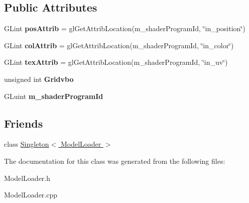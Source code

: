 \subsection*{Public Attributes}
\begin{DoxyCompactItemize}
\item 
\hypertarget{classModelLoader_aa3eb17f659b30e28874112f08f676e18}{
GLint {\bfseries posAttrib} = glGetAttribLocation(m\_\-shaderProgramId, \char`\"{}in\_\-position\char`\"{})}
\label{classModelLoader_aa3eb17f659b30e28874112f08f676e18}

\item 
\hypertarget{classModelLoader_a52a0d4556d91017494e44259692c48d3}{
GLint {\bfseries colAttrib} = glGetAttribLocation(m\_\-shaderProgramId, \char`\"{}in\_\-color\char`\"{})}
\label{classModelLoader_a52a0d4556d91017494e44259692c48d3}

\item 
\hypertarget{classModelLoader_aada21d4b482693f92d503a9beab03abb}{
GLint {\bfseries texAttrib} = glGetAttribLocation(m\_\-shaderProgramId, \char`\"{}in\_\-uv\char`\"{})}
\label{classModelLoader_aada21d4b482693f92d503a9beab03abb}

\item 
\hypertarget{classModelLoader_a590d418ab85aa4654ef94b25eada91d0}{
unsigned int {\bfseries Gridvbo}}
\label{classModelLoader_a590d418ab85aa4654ef94b25eada91d0}

\item 
\hypertarget{classModelLoader_a494e2a0ce1c438005a78611fedeca593}{
GLuint {\bfseries m\_\-shaderProgramId}}
\label{classModelLoader_a494e2a0ce1c438005a78611fedeca593}

\end{DoxyCompactItemize}
\subsection*{Friends}
\begin{DoxyCompactItemize}
\item 
\hypertarget{classModelLoader_af3bfa18f3438adae73421a11b6401066}{
class \hyperlink{classModelLoader_af3bfa18f3438adae73421a11b6401066}{Singleton$<$ ModelLoader $>$}}
\label{classModelLoader_af3bfa18f3438adae73421a11b6401066}

\end{DoxyCompactItemize}


The documentation for this class was generated from the following files:\begin{DoxyCompactItemize}
\item 
ModelLoader.h\item 
ModelLoader.cpp\end{DoxyCompactItemize}
